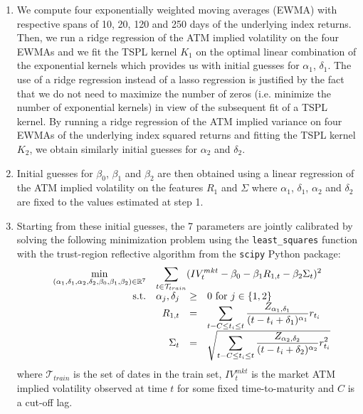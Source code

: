 \begin{enumerate}
    \item We compute four exponentially weighted moving averages (EWMA) with respective spans of 10, 20, 120 and 250 days of the underlying index returns. Then, we run a ridge regression of the ATM implied volatility on the four EWMAs and we fit the TSPL kernel $K_1$ on the optimal linear combination of the exponential kernels which provides us with initial guesses for $\alpha_1$, $\delta_1$. The use of a ridge regression instead of a lasso regression is justified by the fact that we do not need to maximize the number of zeros (i.e. minimize the number of exponential kernels) in view of the subsequent fit of a TSPL kernel. By running a ridge regression of the ATM implied variance on four EWMAs of the underlying index squared returns and fitting the TSPL kernel $K_2$, we obtain similarly initial guesses for $\alpha_2$ and $\delta_2$.  
    \item Initial guesses for $\beta_0$, $\beta_1$ and $\beta_2$ are then obtained using a linear regression of the ATM implied volatility on the features $R_1$ and $\Sigma$ where $\alpha_1$, $\delta_1$, $\alpha_2$ and $\delta_2$ are fixed to the values estimated at step 1. 
    \item Starting from these initial guesses, the 7 parameters are jointly calibrated by solving the following minimization problem using the \texttt{least\_squares} function with the trust-region reflective algorithm from the \texttt{scipy} Python package:
    \begin{equation}\label{eq:target_fun}
        \begin{array}{rrrlll}
        \displaystyle\min_{(\alpha_1,\delta_1,\alpha_2,\delta_2,\beta_0,\beta_1,\beta_2) \in \mathbb{R}^7} & \multicolumn{5}{c}{\displaystyle\sum_{t\in \mathcal{T}_{train}} (IV^{mkt}_t - \beta_0-\beta_1R_{1,t}-\beta_2\Sigma_t)^2 } \\
       \text{s.t.} & \alpha_j, \delta_j &\ge& 0 \text{ for } j \in \{1,2\} \\
       &R_{1,t} &=& \displaystyle\sum_{t-C\le t_i \le t} \frac{Z_{\alpha_1,\delta_1}}{(t-t_i+\delta_1)^{\alpha_1}} r_{t_i} \\
      &\Sigma_{t} &=& \sqrt{\displaystyle\sum_{t-C\le t_i \le t} \frac{Z_{\alpha_2,\delta_2}}{(t-t_i+\delta_2)^{\alpha_2}} r_{t_i}^2}
        \end{array}
    \end{equation}
    where $\mathcal{T}_{train}$ is the set of dates in the train set, $IV^{mkt}_t$ is the market ATM implied volatility observed at time $t$ for some fixed time-to-maturity and $C$ is a cut-off lag. 
\end{enumerate}

